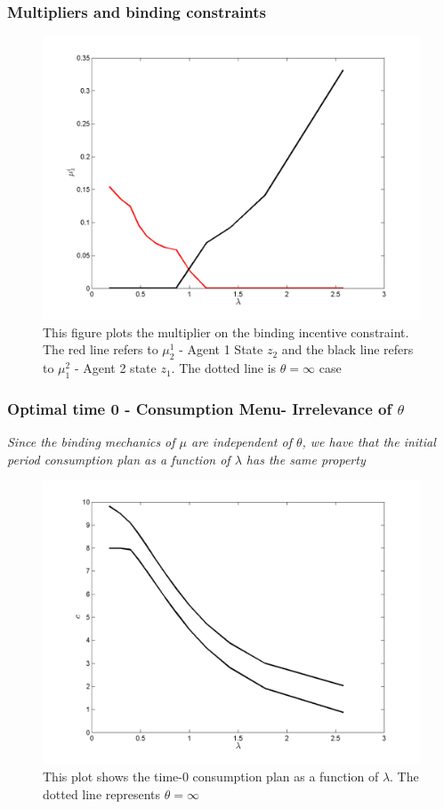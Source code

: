 \documentclass{beamer}
\theoremstyle{definition}
\begin{document}
\begin{frame}
\frametitle{Multipliers and binding constraints}
\begin{figure}[htbp]
\centering
	  \includegraphics[scale=0.4]{Matlab/PrivateInformation/Plots/BindingMultipliers.png}
	\caption{ This figure plots the multiplier on the binding incentive
 constraint. The red line refers to $\mu^1_2$ - Agent 1 State $z_2$ and the
 black line refers to $\mu^2_1$ - Agent 2 state $z_1$. The dotted line is
 $\theta=\infty$ case}
	\label{fig:BindingMultipliers}
\end{figure} 
\end{frame}


\begin{frame}
\frametitle{Optimal time 0 - Consumption Menu- Irrelevance of $\theta$}
\emph{Since the binding mechanics of $\mu$ are independent of $\theta$, we have that the initial period consumption plan as a function of $\lambda$ has the same property }
\begin{figure}[htbp]
\centering
	  \includegraphics[scale=0.35]{Matlab/PrivateInformation/Plots/CompOptContractCons.png}

	\caption{\small{This plot shows the time-0 consumption plan as a function of $\lambda$. The dotted line represents $\theta=\infty$}}
	\label{fig:CompOptContractCons}
\end{figure} 
\end{frame}
\end{document}
